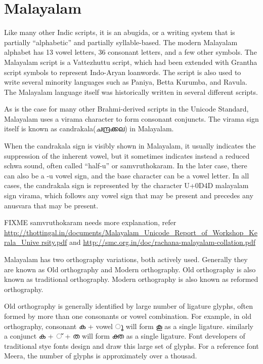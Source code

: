 \chapter{Malayalam}

Like many other Indic scripts, it is an abugida, or a writing system
that is partially “alphabetic” and partially syllable-based. The
modern Malayalam alphabet has 13 vowel letters, 36 consonant letters,
and a few other symbols. The Malayalam script is a Vattezhuttu script,
which had been extended with Grantha script symbols to represent
Indo-Aryan loanwords. The script is also used to write several
minority languages such as Paniya, Betta Kurumba, and Ravula. The
Malayalam language itself was historically written in several
different scripts.

As is the case for many other Brahmi-derived scripts in the Unicode
Standard, Malayalam uses a virama character to form consonant
conjuncts. The virama sign itself is known as candrakala({\meera ചന്ദ്രക്കല}) in
Malayalam.

When the candrakala sign is visibly shown in Malayalam, it usually
indicates the suppression of the inherent vowel, but it sometimes
indicates instead a reduced schwa sound, often called “half-u” or
samvruthokaram. In the later case, there can also be a -u vowel sign,
and the base character can be a vowel letter. In all cases, the
candrakala sign is represented by the character U+0D4D malayalam sign
virama, which follows any vowel sign that may be present and precedes
any anusvara that may be present.

FIXME samvruthokaram needs more explanation, refer
{\url{
http://thottingal.in/documents/Malayalam_Unicode_Report_of_Workshop_Kerala_Unive
rsity.pdf}}
and {\url{http://smc.org.in/doc/rachana-malayalam-collation.pdf}}


Malayalam has two orthography variations, both actively
used. Generally they are known as Old orthography and Modern
orthography. Old orthography is also known as traditional
orthography. Modern orthography is also known as reformed orthography.

Old orthography is generally identified by large number of ligature
glyphs, often formed by more than one consonants or vowel
combination. For example, in old orthography, consonant {\meera ക} +
vowel { \meera ൂ} will form കൂ as a single ligature. similarly a
conjunct {\meera ക + ് + ത} will form {\meera ക്ത} as a single
ligature. Font developers of traditional stye fonts design and draw
this large set of glyphs. For a reference font Meera, the number of
glyphs is approximately over a thousad.

